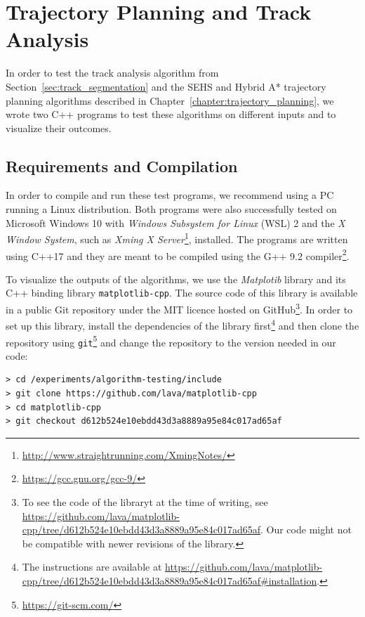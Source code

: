 \section{Trajectory Planning and Track Analysis}

In order to test the track analysis algorithm from Section~\ref{sec:track_segmentation} and the \gls{SEHS} and Hybrid A* trajectory planning algorithms described in Chapter~\ref{chapter:trajectory_planning}, we wrote two C++ programs to test these algorithms on different inputs and to visualize their outcomes.

\subsection{Requirements and Compilation}

In order to compile and run these test programs, we recommend using a PC running a Linux distribution. Both programs were also successfully tested on Microsoft Windows 10 with \textit{Windows Subsystem for Linux} (WSL) 2 and the \textit{X Window System}, such as \textit{Xming X Server}\footnote{\url{http://www.straightrunning.com/XmingNotes/}}, installed. The programs are written using C++17 and they are meant to be compiled using the G++ 9.2 compiler\footnote{\url{https://gcc.gnu.org/gcc-9/}}.

To visualize the outputs of the algorithms, we use the \textit{Matplotib} library and its C++ binding library \texttt{matplotlib-cpp}. The source code of this library is available in a public Git repository under the MIT licence hosted on GitHub\footnote{To see the code of the libraryt at the time of writing, see \url{https://github.com/lava/matplotlib-cpp/tree/d612b524e10ebdd43d3a8889a95e84c017ad65af}. Our code might not be compatible with newer revisions of the library.}. In order to set up this library, install the dependencies of the library first\footnote{The instructions are available at \url{https://github.com/lava/matplotlib-cpp/tree/d612b524e10ebdd43d3a8889a95e84c017ad65af#installation}.} and then clone the repository using \texttt{git}\footnote{\url{https://git-scm.com/}} and change the repository to the version needed in our code:

\begin{verbatim}
> cd /experiments/algorithm-testing/include
> git clone https://github.com/lava/matplotlib-cpp
> cd matplotlib-cpp
> git checkout d612b524e10ebdd43d3a8889a95e84c017ad65af
\end{verbatim}

